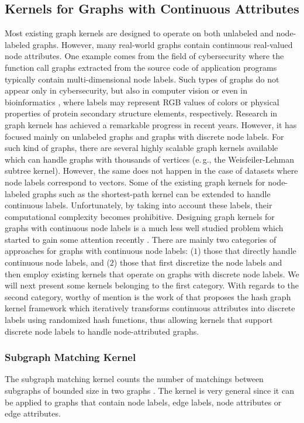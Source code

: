 \documentclass[twoside,11pt]{article}
\newcommand{\eg}{e.\,g., }
\begin{document}
\subsection{Kernels for Graphs with Continuous Attributes}
Most existing graph kernels are designed to operate on both unlabeled and node-labeled graphs.
However, many real-world graphs contain continuous real-valued node attributes.
One example comes from the field of cybersecurity where the function call graphs extracted from the source code of application programs typically contain multi-dimensional node labels. 
Such types of graphs do not appear only in cybersecurity, but also in computer vision  or even in bioinformatics , where labels may represent RGB values of colors or physical properties of protein secondary structure elements, respectively.
Research in graph kernels has achieved a remarkable progress in recent years.
However, it has focused mainly on unlabeled graphs and graphs with discrete node labels.
For such kind of graphs, there are several highly scalable graph kernels available which can handle graphs with thousands of vertices (\eg the Weisfeiler-Lehman subtree kernel).
However, the same does not happen in the case of datasets where node labels correspond to vectors.
Some of the existing graph kernels for node-labeled graphs such as the shortest-path kernel can be extended to handle continuous labels.
Unfortunately, by taking into account these labels, their computational complexity becomes prohibitive.
Designing graph kernels for graphs with continuous node labels is a much less well studied problem which started to gain some attention recently .
There are mainly two categories of approaches for graphs with continuous node labels: ($1$) those that directly handle continuous node labels, and ($2$) those that first discretize the node labels and then employ existing kernels that operate on graphs with discrete node labels.
We will next present some kernels belonging to the first category.
With regards to the second category, worthy of mention is the work of  that proposes the hash graph kernel framework which iteratively transforms continuous attributes into discrete labels using randomized hash functions, thus allowing kernels that support discrete node labels to handle node-attributed graphs.


\subsubsection{Subgraph Matching Kernel}
The subgraph matching kernel counts the number of matchings between subgraphs of bounded size in two graphs .
The kernel is very general since it can be applied to graphs that contain node labels, edge labels, node attributes or edge attributes.
\end{document}
